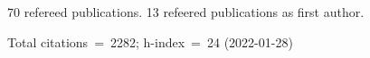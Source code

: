 70 refereed publications. 13 refeered publications as first author.

Total citations~=~2282; h-index~=~24 (2022-01-28)